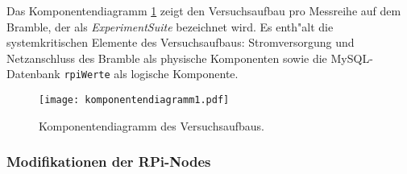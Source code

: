 Das Komponentendiagramm \ref{fig:Komponentendiagramm} zeigt den Versuchsaufbau pro Messreihe auf dem Bramble, der als \textit{ExperimentSuite} bezeichnet wird. Es enth"alt die systemkritischen Elemente des Versuchsaufbaus: Stromversorgung und Netzanschluss des Bramble als physische Komponenten sowie die MySQL-Datenbank \texttt{rpiWerte} als logische Komponente. 
\begin{figure}[htb]
  \centering
  \texttt{[image: komponentendiagramm1.pdf]}\\ 
  \caption{Komponentendiagramm des Versuchsaufbaus.}
  \label{fig:Komponentendiagramm}		
\end{figure}

\subsubsection{Modifikationen der RPi-Nodes}

